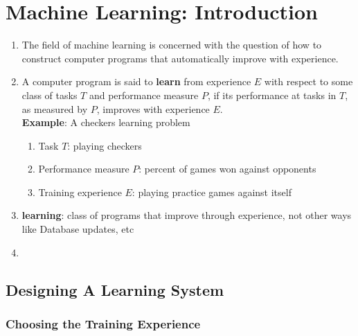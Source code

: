 \chapter{Machine Learning: Introduction}

\begin{enumerate}[itemsep=0.2cm]
    \item The field of machine learning is concerned with the question of how to construct computer programs that automatically improve with experience.
    \hfill \cite{ml/book/Machine-Learning/Tom-M-Mitchell}

    \item A computer program is said to \textbf{learn} from experience $E$ with respect to some class of tasks $T$ and performance measure $P$, if its performance at tasks in $T$, as measured by $P$, improves with experience $E$.
    \hfill \cite{ml/book/Machine-Learning/Tom-M-Mitchell}
    \\
    \textbf{Example}: A checkers learning problem
    \begin{enumerate}
        \item Task $T$: playing checkers
        \hfill \cite{ml/book/Machine-Learning/Tom-M-Mitchell}
        
        \item Performance measure $P$: percent of games won against opponents
        \hfill \cite{ml/book/Machine-Learning/Tom-M-Mitchell}
        
        \item Training experience $E$: playing practice games against itself 
        \hfill \cite{ml/book/Machine-Learning/Tom-M-Mitchell}
    \end{enumerate}
    
    \item \textbf{learning}: class of programs that improve through experience, not other ways like Database updates, etc
    \hfill \cite{ml/book/Machine-Learning/Tom-M-Mitchell}

    \item 
\end{enumerate}



\section{Designing A Learning System}

\subsection{Choosing the Training Experience \cite{ml/book/Machine-Learning/Tom-M-Mitchell}}

